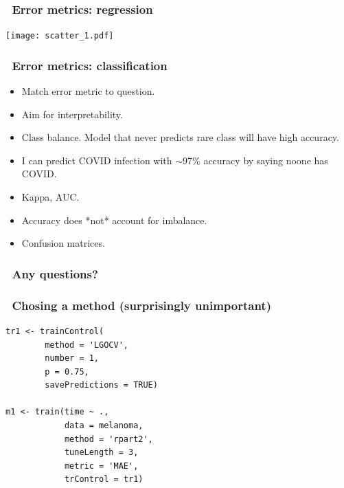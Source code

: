 \documentclass[handout, aspectratio = 169]{beamer}
\begin{document}
  \begin{frame}[fragile]
\frametitle{\insertframenumber~Error metrics: regression}

\vspace{5mm}
    \begin{center}
     \texttt{[image: scatter\_1.pdf]}
     \end{center}

\end{frame}




\begin{frame}
\frametitle{\insertframenumber~Error metrics: classification}

\begin{itemize}
\item Match error metric to question.
\item Aim for interpretability.
\item Class balance. Model that never predicts rare class will have high accuracy.
\item I can predict COVID infection with $\sim$97\% accuracy by saying noone has COVID. 
\item Kappa, AUC.
\item Accuracy does *not* account for imbalance.
\item Confusion matrices.
\end{itemize}
\end{frame} 


\begin{frame}
\frametitle{\insertframenumber~Any questions?}


\end{frame} 





\begin{frame}[fragile]
\frametitle{\insertframenumber~Chosing a method (surprisingly unimportant)}
\renewcommand{\FancyVerbFormatLine}[1]{%
   \ifnum\value{FancyVerbLine}=9\color{cyan}#1%
   \else #1\fi}
\begin{Verbatim}
tr1 <- trainControl(
        method = 'LGOCV',
        number = 1,
        p = 0.75,
        savePredictions = TRUE)

m1 <- train(time ~ ., 
            data = melanoma,
            method = 'rpart2',
            tuneLength = 3,
            metric = 'MAE',
            trControl = tr1)
            
\end{Verbatim}

\end{frame} 
\end{document}
